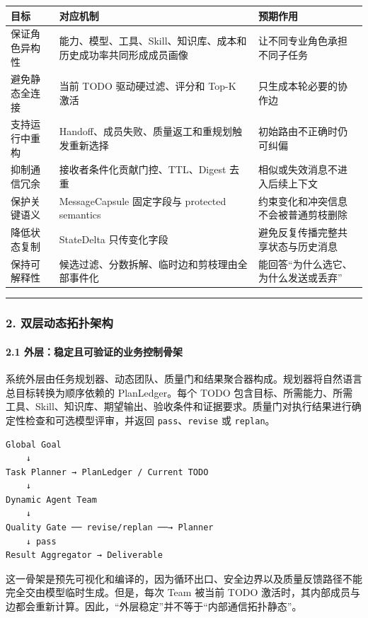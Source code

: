 \documentclass[UTF8,a4paper,12pt]{ctexart}
\begin{document}
\begin{longtable}[]{@{}lll@{}}
\toprule
目标 & 对应机制 & 预期作用 \\
\midrule
\endhead
保证角色异构性 & 能力、模型、工具、Skill、知识库、成本和历史成功率共同形成成员画像 & 让不同专业角色承担不同子任务 \\
避免静态全连接 & 当前 TODO 驱动硬过滤、评分和 Top-K 激活 & 只生成本轮必要的协作边 \\
支持运行中重构 & Handoff、成员失败、质量返工和重规划触发重新选择 & 初始路由不正确时仍可纠偏 \\
抑制通信冗余 & 接收者条件化贡献门控、TTL、Digest 去重 & 相似或失效消息不进入后续上下文 \\
保护关键语义 & MessageCapsule 固定字段与 protected semantics & 约束变化和冲突信息不会被普通剪枝删除 \\
降低状态复制 & StateDelta 只传变化字段 & 避免反复传播完整共享状态与历史消息 \\
保持可解释性 & 候选过滤、分数拆解、临时边和剪枝理由全部事件化 & 能回答``为什么选它、为什么发送或丢弃'' \\
\bottomrule
\end{longtable}

\begin{center}\rule{0.5\linewidth}{0.5pt}\end{center}

\subsubsection{2. 双层动态拓扑架构}

\paragraph{2.1 外层：稳定且可验证的业务控制骨架}

系统外层由任务规划器、动态团队、质量门和结果聚合器构成。规划器将自然语言总目标转换为顺序依赖的 PlanLedger。每个 TODO 包含目标、所需能力、所需工具、Skill、知识库、期望输出、验收条件和证据要求。质量门对执行结果进行确定性检查和可选模型评审，并返回 \texttt{pass}、\texttt{revise} 或 \texttt{replan}。

\begin{verbatim}
Global Goal
    ↓
Task Planner → PlanLedger / Current TODO
    ↓
Dynamic Agent Team
    ↓
Quality Gate ── revise/replan ──→ Planner
    ↓ pass
Result Aggregator → Deliverable
\end{verbatim}

这一骨架是预先可视化和编译的，因为循环出口、安全边界以及质量反馈路径不能完全交由模型临时生成。但是，每次 Team 被当前 TODO 激活时，其内部成员与边都会重新计算。因此，``外层稳定''并不等于``内部通信拓扑静态''。
\end{document}
